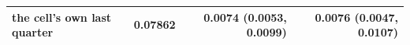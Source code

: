 \begin{tabular}{lrrr}
the cell's own last quarter & 0.07862 & 0.0074 (0.0053, 0.0099) & 0.0076 (0.0047, 0.0107) \\
\bottomrule
\end{tabular}
